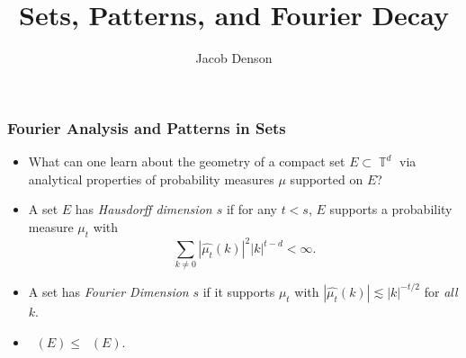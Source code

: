 \documentclass[handout,usenames,dvipsnames]{beamer}
\title{Sets, Patterns, and Fourier Decay}
\author{Jacob Denson}
\institute{}
\DeclareMathOperator{\TT}{\mathbb{T}}
\DeclareMathOperator{\fordim}{\text{dim}_{\mathbb{F}}}
\DeclareMathOperator{\hausdim}{\text{dim}_{\mathbb{H}}}
\begin{document}
\maketitle

\begin{frame}
    \frametitle{Fourier Analysis and Patterns in Sets}

    \begin{itemize}
        \item What can one learn about the geometry of a compact set $E \subset \TT^d$ via analytical properties of probability measures $\mu$ supported on $E$?
        \pause

        \item A set $E$ has \emph{Hausdorff dimension $s$} if for any $t < s$, $E$ supports a probability measure $\mu_t$ with
        \[ \sum_{k \neq 0} |\widehat{\mu_t}(k)|^2 |k|^{t-d} < \infty. \]
        \pause

        \item A set has \emph{Fourier Dimension} $s$ if it supports $\mu_t$ with $|\widehat{\mu_t}(k)| \lesssim |k|^{-t/2}$ for \emph{all} $k$.

        \item $\fordim(E) \leq \hausdim(E)$.
    \end{itemize}
\end{frame}
\end{document}
